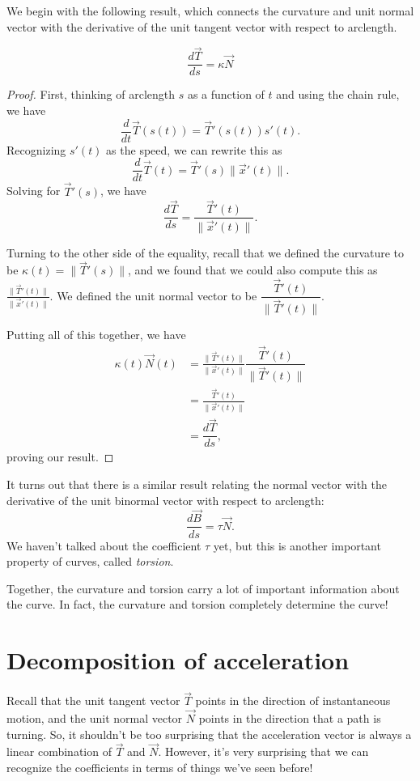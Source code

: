 \documentclass{ximera}
\begin{document}
We begin with the following result, which connects the curvature and unit normal vector with the derivative of the unit tangent vector with respect to arclength.

\begin{proposition}
\[
\dfrac{d\vec{T}}{ds} = \kappa\vec{N}
\]
\end{proposition}

\begin{proof}
First, thinking of arclength $s$ as a function of $t$ and using the chain rule, we have
\[
\dfrac{d}{dt}\vec{T}(s(t)) = \vec{T}'(s(t))s'(t).
\]
Recognizing $s'(t)$ as the speed, we can rewrite this as 
\[
\dfrac{d}{dt}\vec{T}(t) = \vec{T}'(s)\|\vec{x}'(t)\|.
\]
Solving for $\vec{T}'(s)$, we have 
\[
\dfrac{d\vec{T}}{ds} = \dfrac{\vec{T}'(t)}{\|\vec{x}'(t)\|}.
\]

Turning to the other side of the equality, recall that we defined the curvature to be $\kappa(t) = \|\vec{T}'(s)\| $, and we found that we could also compute this as $\frac{\|\vec{T}'(t)\|}{\|\vec{x}'(t)\|}$. We defined the unit normal vector to be $\dfrac{\vec{T}'(t)}{\|\vec{T}'(t)\|}$.

Putting all of this together, we have
\begin{align*}
\kappa(t)\vec{N}(t) &= \frac{\|\vec{T}'(t)\|}{\|\vec{x}'(t)\|}\dfrac{\vec{T}'(t)}{\|\vec{T}'(t)\|}\\
&= \frac{\vec{T}'(t)}{\|\vec{x}'(t)\|}\\
&= \dfrac{d\vec{T}}{ds},
\end{align*}
proving our result.
\end{proof}

It turns out that there is a similar result relating the normal vector with the derivative of the unit binormal vector with respect to arclength:
\[
\dfrac{d\vec{B}}{ds} = \tau\vec{N}.
\]
We haven't talked about the coefficient $\tau$ yet, but this is another important property of curves, called \emph{torsion}.

Together, the curvature and torsion carry a lot of important information about the curve. In fact, the curvature and torsion completely determine the curve!

\section*{Decomposition of acceleration}

Recall that the unit tangent vector $\vec{T}$ points in the direction of instantaneous motion, and the unit normal vector $\vec{N}$ points in the direction that a path is turning. So, it shouldn't be too surprising that the acceleration vector is always a linear combination of $\vec{T}$ and $\vec{N}$. However, it's very surprising that we can recognize the coefficients in terms of things we've seen before!
\end{document}
